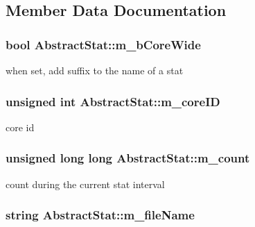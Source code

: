 \subsection{Member Data Documentation}
\hypertarget{classAbstractStat_a39eb3f7796f91946e4fcb76be59c0951}{
\subsubsection[{m\_\-bCoreWide}]{\setlength{\rightskip}{0pt plus 5cm}bool {\bf AbstractStat::m\_\-bCoreWide}}}
\label{classAbstractStat_a39eb3f7796f91946e4fcb76be59c0951}
when set, add suffix to the name of a stat \hypertarget{classAbstractStat_ae5f64870f70c46c9d45421298fe14c41}{
\subsubsection[{m\_\-coreID}]{\setlength{\rightskip}{0pt plus 5cm}unsigned int {\bf AbstractStat::m\_\-coreID}}}
\label{classAbstractStat_ae5f64870f70c46c9d45421298fe14c41}
core id \hypertarget{classAbstractStat_a01d7f2515084aa821e717b2cb3ecbf34}{
\subsubsection[{m\_\-count}]{\setlength{\rightskip}{0pt plus 5cm}unsigned long long {\bf AbstractStat::m\_\-count}}}
\label{classAbstractStat_a01d7f2515084aa821e717b2cb3ecbf34}
count during the current stat interval \hypertarget{classAbstractStat_acc58d3d15674660dbf0955193712d36f}{
\subsubsection[{m\_\-fileName}]{\setlength{\rightskip}{0pt plus 5cm}string {\bf AbstractStat::m\_\-fileName}}}
